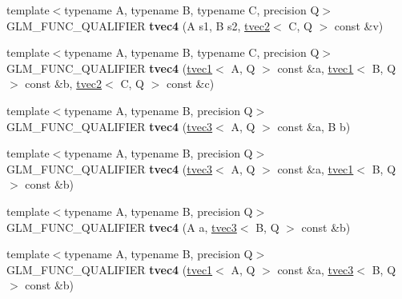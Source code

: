\begin{DoxyCompactItemize}
\item 
\hypertarget{structglm_1_1tvec4_a38283d59d20b4fce9e7334af63f6029e}{{\footnotesize template$<$typename A, typename B, typename C, precision Q$>$ }\\G\-L\-M\-\_\-\-F\-U\-N\-C\-\_\-\-Q\-U\-A\-L\-I\-F\-I\-E\-R {\bfseries tvec4} (A s1, B s2, \hyperlink{structglm_1_1tvec2}{tvec2}$<$ C, Q $>$ const \&v)}\label{structglm_1_1tvec4_a38283d59d20b4fce9e7334af63f6029e}

\item 
\hypertarget{structglm_1_1tvec4_a55d5cbe156f46572c73c234a0793bcf7}{{\footnotesize template$<$typename A, typename B, typename C, precision Q$>$ }\\G\-L\-M\-\_\-\-F\-U\-N\-C\-\_\-\-Q\-U\-A\-L\-I\-F\-I\-E\-R {\bfseries tvec4} (\hyperlink{structglm_1_1tvec1}{tvec1}$<$ A, Q $>$ const \&a, \hyperlink{structglm_1_1tvec1}{tvec1}$<$ B, Q $>$ const \&b, \hyperlink{structglm_1_1tvec2}{tvec2}$<$ C, Q $>$ const \&c)}\label{structglm_1_1tvec4_a55d5cbe156f46572c73c234a0793bcf7}

\item 
\hypertarget{structglm_1_1tvec4_a83e0d710094ad7bfcce6c35cd71cf448}{{\footnotesize template$<$typename A, typename B, precision Q$>$ }\\G\-L\-M\-\_\-\-F\-U\-N\-C\-\_\-\-Q\-U\-A\-L\-I\-F\-I\-E\-R {\bfseries tvec4} (\hyperlink{structglm_1_1tvec3}{tvec3}$<$ A, Q $>$ const \&a, B b)}\label{structglm_1_1tvec4_a83e0d710094ad7bfcce6c35cd71cf448}

\item 
\hypertarget{structglm_1_1tvec4_aa6710646ec38989636460be421d32c2d}{{\footnotesize template$<$typename A, typename B, precision Q$>$ }\\G\-L\-M\-\_\-\-F\-U\-N\-C\-\_\-\-Q\-U\-A\-L\-I\-F\-I\-E\-R {\bfseries tvec4} (\hyperlink{structglm_1_1tvec3}{tvec3}$<$ A, Q $>$ const \&a, \hyperlink{structglm_1_1tvec1}{tvec1}$<$ B, Q $>$ const \&b)}\label{structglm_1_1tvec4_aa6710646ec38989636460be421d32c2d}

\item 
\hypertarget{structglm_1_1tvec4_a1b445526ae2df23ae847f786d6c6f8c6}{{\footnotesize template$<$typename A, typename B, precision Q$>$ }\\G\-L\-M\-\_\-\-F\-U\-N\-C\-\_\-\-Q\-U\-A\-L\-I\-F\-I\-E\-R {\bfseries tvec4} (A a, \hyperlink{structglm_1_1tvec3}{tvec3}$<$ B, Q $>$ const \&b)}\label{structglm_1_1tvec4_a1b445526ae2df23ae847f786d6c6f8c6}

\item 
\hypertarget{structglm_1_1tvec4_ac23c6668dc744d3d2e759c165c72b6bb}{{\footnotesize template$<$typename A, typename B, precision Q$>$ }\\G\-L\-M\-\_\-\-F\-U\-N\-C\-\_\-\-Q\-U\-A\-L\-I\-F\-I\-E\-R {\bfseries tvec4} (\hyperlink{structglm_1_1tvec1}{tvec1}$<$ A, Q $>$ const \&a, \hyperlink{structglm_1_1tvec3}{tvec3}$<$ B, Q $>$ const \&b)}\label{structglm_1_1tvec4_ac23c6668dc744d3d2e759c165c72b6bb}


\end{DoxyCompactItemize}
